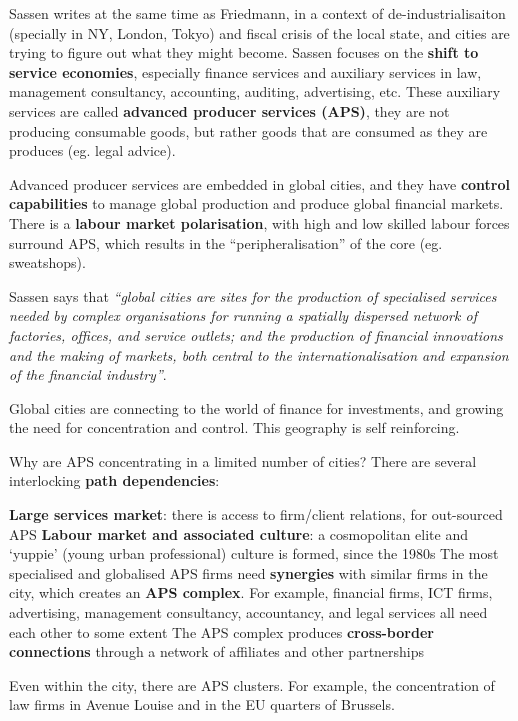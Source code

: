 \documentclass{article}
\begin{document}
Sassen writes at the same time as Friedmann, in a context of de-industrialisaiton (specially in NY, London, Tokyo) and fiscal crisis of the local state, and cities are trying to figure out what they might become.
Sassen focuses on the \textbf{shift to service economies}, especially finance services and auxiliary services in law, management consultancy, accounting, auditing, advertising, etc. These auxiliary services are called \textbf{advanced producer services (APS)}, they are not producing consumable goods, but rather goods that are consumed as they are produces (eg. legal advice).

Advanced producer services are embedded in global cities, and they have \textbf{control capabilities} to manage global production and produce global financial markets. There is a \textbf{labour market polarisation}, with high and low skilled labour forces surround APS, which results in the ``peripheralisation'' of the core (eg. sweatshops).

Sassen says that \textit{``global cities are sites for the production of specialised services needed by complex organisations for running a spatially dispersed network of factories, offices, and service outlets; and the production of financial innovations and the making of markets, both central to the internationalisation and expansion of the financial industry''}.

Global cities are connecting to the world of finance for investments, and growing the need for concentration and control. This geography is self reinforcing.

Why are APS concentrating in a limited number of cities? There are several interlocking \textbf{path dependencies}:
\begin{outline}
	\1 \textbf{Large services market}: there is access to firm/client relations, for out-sourced APS
	\1 \textbf{Labour market and associated culture}: a cosmopolitan elite and `yuppie' (young urban professional) culture is formed, since the 1980s
	\1 The most specialised and globalised APS firms need \textbf{synergies} with similar firms in the city, which creates an \textbf{APS complex}. For example, financial firms, ICT firms, advertising, management consultancy, accountancy, and legal services all need each other to some extent
	\1 The APS complex produces \textbf{cross-border connections} through a network of affiliates and other partnerships
\end{outline}

Even within the city, there are APS clusters. For example, the concentration of law firms in Avenue Louise and in the EU quarters of Brussels.
\end{document}
